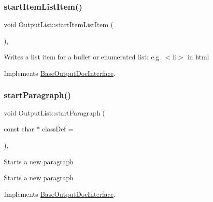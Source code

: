 \mbox{\label{class_output_list_a77e30e9a84b48907b886e8231dbbc20b}} 
\subsubsection{\texorpdfstring{startItemListItem()}{startItemListItem()}}
{\footnotesize\ttfamily void Output\+List\+::start\+Item\+List\+Item (\begin{DoxyParamCaption}{ }\end{DoxyParamCaption})\hspace{0.3cm}{\ttfamily [inline]}, {\ttfamily [virtual]}}

Writes a list item for a bullet or enumerated list\+: e.\+g. {\ttfamily $<$li$>$} in html 

Implements \mbox{\hyperlink{class_base_output_doc_interface_aa1cbcadfedf8e6d52029d17526b5fa3f}{Base\+Output\+Doc\+Interface}}.

\mbox{\label{class_output_list_a809351ce4027f4fc083cfb68d5e740eb}} 
\subsubsection{\texorpdfstring{startParagraph()}{startParagraph()}}
{\footnotesize\ttfamily void Output\+List\+::start\+Paragraph (\begin{DoxyParamCaption}\item[{const char $\ast$}]{class\+Def = {} }\end{DoxyParamCaption})\hspace{0.3cm}{\ttfamily [inline]}, {\ttfamily [virtual]}}

Starts a new paragraph

Starts a new paragraph 

Implements \mbox{\hyperlink{class_base_output_doc_interface_a9f711f4ef8f48b9c7b1cae625578e7ff}{Base\+Output\+Doc\+Interface}}.

\mbox{\label{class_output_list_a848e77a8fd7af578497f7ee1ec163b98}} 
